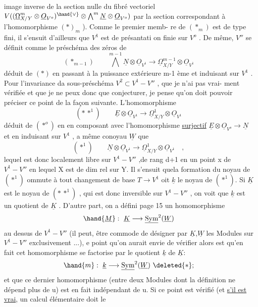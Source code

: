 
image inverse de la section nulle du fibré vectoriel $V((\underline{\Omega}^m_{X/Y}\otimes\underline{O}_{V^o})^{\hand{\vee}}\otimes\bigwedge^m\underline{N}\otimes\underline{O}_{V^o})$
par la section correspondant à l'homomorphisme $(*)_{m}$ ). Comme le premier memb-%
re de $(*_m)$ est de type fini, il s'ensuit d'ailleurs que $V^1$ est de présantati%
on finie sur $V^o$ . De même, $V''$ se définit comme le préschéma des zéros de
\[ (*_{m-1}) \qquad \bigwedge^{m-1}\underline{N}\otimes\underline{O}_{V^1} \longrightarrow \underline{\Omega}^{m-1}_{X/Y}\otimes\underline{O}_{V^1} \]
déduit de $(*)$ en passant à la puissance extérieure m-1 ème et induisant sur
$V^1$ . Pour l'invariance da sous-préschéma $V^2\subset V^1-V''$ , que je n'ai pas vrai-%
ment vérifiée et que je ne peux donc que conjecturer, je pense qu'on doit
pouvoir préciser ce point de la façon suivante. L'homomorphisme
\[ (*\,*^1) \qquad \underline{E}\otimes\underline{O}_{V^1}\longrightarrow\underline{\Omega}^1_{X/Y}\otimes\underline{O}_{V^1} \]
déduit de $(*^o)$ en  en composant avec l'homomorphisme
\uline{surjectif} $\underline{E}\otimes\underline{O}_{V^o}\to\underline{N}$ et en  induisant sur $V^1$ , a même conoyau
$\underline{W}$ que
\[ (*^1) \qquad \underline{N}\otimes\underline{O}_{V^1}\to\underline{\Omega}^1_{X/Y}\otimes\underline{O}_{V^1} \quad , \]
lequel  est donc localement libre sur $V^1-V''$ ,\hand{(}de rang d+1 en un point
x de $V^1-V''$ en lequel X est de dim rel  sur Y\hand{)}. Il s'ensuit quela formation
du noyau de $(*^1)$ ommute à tout changement de base $T\to V^1$ oit $\underline{k}$ le
noyau de $(*^1)$. Si $\underline{K}$ est le noyau de $(*\,*^1)$ , qui est donc inversible sur
$V^1-V''$ , on voit  que $\underline{k}$ est un quotient de $\underline{K}$ . D'autre part, on a défini
page 15 un homomorphisme
\[ \hand{\underline{M}} : \ \underline{K}\longrightarrow\underline{\mathrm{Sym}}^2(\underline{W}) \]
au dessus de $V^1-V''$ (il peut, être commode de désigner par $\underline{K}$,$\underline{W}$ les Modules
sur $V^1-V''$ exclusivement ...),  e point qu'on aurait envie de vérifier
alors est qu'en fait cet homomorphisme se factorise par le quotient $\underline{k}$ de $\underline{K}$:
\[ \hand{m} : \ \underline{k}\longrightarrow\underline{\mathrm{Sym}}^2(\underline{W}) \ \deleted{*} ; \]
et que ce dernier homomorphisme (entre deux Modules dont la définition ne
 dépend plus de u) est en fait indépendant de
u. Si ce point est vérifié (et \uline{s'il est vrai}, un calcul élémentaire doit le

